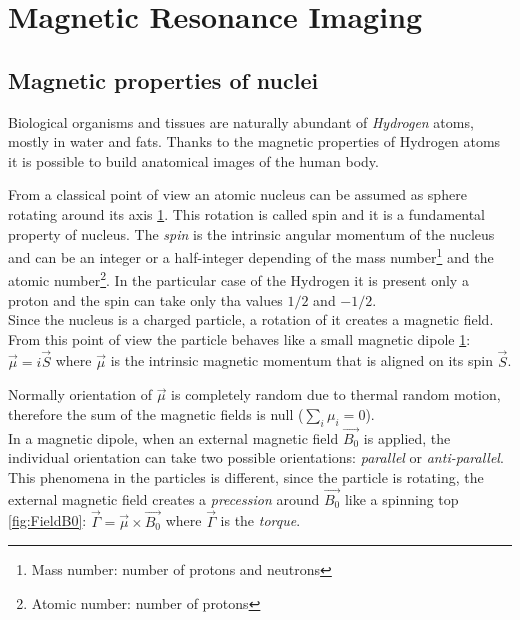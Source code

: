 \section{Magnetic Resonance Imaging}
 \subsection{Magnetic properties of nuclei}
 Biological organisms and tissues are naturally abundant of \emph{Hydrogen} atoms, mostly in water and fats. Thanks to the magnetic properties of Hydrogen atoms it is possible to build anatomical images of the human body.

 From a classical point of view an atomic nucleus can be assumed as sphere rotating around its axis \ref{fig:sphere_rotating}. This rotation is called spin and it is a fundamental property of nucleus. The \emph{spin} is the intrinsic angular momentum of the nucleus and can be an integer or a half-integer depending of the mass number\footnote{Mass number: number of protons and neutrons} and the atomic number\footnote{Atomic number: number of protons}. In the particular case of the Hydrogen it is present only a proton and the spin can take only tha values $1/2$ and $-1/2$. \\
 Since the nucleus is a charged particle, a rotation of it creates a magnetic field. From this point of view the particle behaves like a small magnetic dipole \ref{fig:sphere_rotating}: $\vec{\mu}=i\vec{S}$ where $\vec{\mu}$ is the intrinsic magnetic momentum that is aligned on its spin $\vec{S}$.

 \begin{figure}[h]
    \centering
    \caption{}
    \label{fig:sphere_rotating}
  \end{figure}

 \noindent Normally orientation of $\vec{\mu}$ is completely random due to thermal random motion, therefore the sum of the magnetic fields is null ($\sum_{i} \mu_{i} = 0$). \\
 In a magnetic dipole, when an external magnetic field $\vec{B_{0}}$ is applied, the individual orientation can take two possible orientations: \emph{parallel} or \emph{anti-parallel}. This phenomena in the particles is different, since the particle is rotating, the external magnetic field creates a \emph{precession} around $\vec{B_{0}}$ like a spinning top \ref{fig:FieldB0}: $\vec{\Gamma}=\vec{\mu} \times \vec{B_{0}}$ where $\vec{\Gamma}$ is the \emph{torque}.

